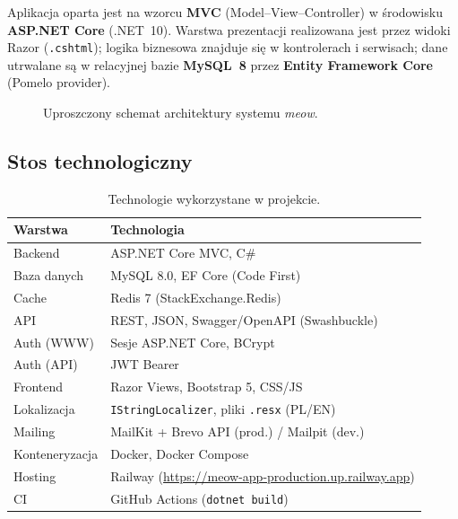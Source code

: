 \documentclass[12pt,a4paper]{article}
\begin{document}
Aplikacja oparta jest na wzorcu \textbf{MVC} (Model--View--Controller) w środowisku
\textbf{ASP.NET Core} (.NET~10). Warstwa prezentacji realizowana jest przez widoki
Razor (\texttt{.cshtml}); logika biznesowa znajduje się w kontrolerach i serwisach;
dane utrwalane są w relacyjnej bazie \textbf{MySQL~8} przez \textbf{Entity Framework Core}
(Pomelo provider).

\begin{figure}[H]
\centering
{}
\caption{Uproszczony schemat architektury systemu \textit{meow}.}
\end{figure}

\subsection{Stos technologiczny}

\begin{table}[H]
\centering
\caption{Technologie wykorzystane w projekcie.}
\begin{tabular}{@{}ll@{}}
\toprule
\textbf{Warstwa} & \textbf{Technologia} \\
\midrule
Backend & ASP.NET Core MVC, C\# \\
Baza danych & MySQL 8.0, EF Core (Code First) \\
Cache & Redis 7 (StackExchange.Redis) \\
API & REST, JSON, Swagger/OpenAPI (Swashbuckle) \\
Auth (WWW) & Sesje ASP.NET Core, BCrypt \\
Auth (API) & JWT Bearer \\
Frontend & Razor Views, Bootstrap 5, CSS/JS \\
Lokalizacja & \texttt{IStringLocalizer}, pliki \texttt{.resx} (PL/EN) \\
Mailing & MailKit + Brevo API (prod.) / Mailpit (dev.) \\
Konteneryzacja & Docker, Docker Compose \\
Hosting & Railway (\url{https://meow-app-production.up.railway.app}) \\
CI & GitHub Actions (\texttt{dotnet build}) \\
\bottomrule
\end{tabular}
\end{table}
\end{document}
